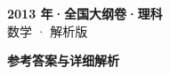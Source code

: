 \documentclass[zihao=-4, a4paper]{ctexart}
\begin{document}
\begin{center}
  {\Large\bfseries 2013 年·全国大纲卷·理科}\\[4pt]
  {\large 数学 · 解析版}
\end{center}
\medskip
{}

\clearpage
{}
\begin{center}{\Large\bfseries 参考答案与详细解析}\end{center}
\medskip

\end{document}
